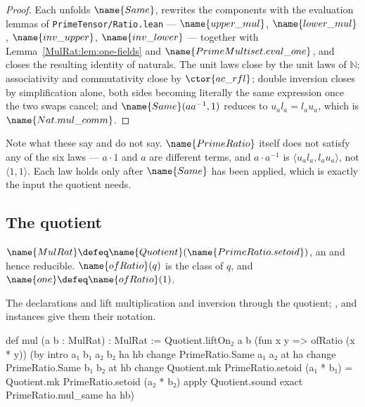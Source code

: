 \begin{proof}
Each unfolds $\name{Same}$, rewrites the components with the evaluation lemmas
of \texttt{PrimeTensor/Ratio.lean} --- $\name{upper\_mul}$,
$\name{lower\_mul}$, $\name{inv\_upper}$, $\name{inv\_lower}$ --- together
with Lemma~\ref{MulRat:lem:one-fields} and $\name{PrimeMultiset.eval\_one}$,
and closes the resulting identity of naturals.  The unit laws close by the
unit laws of $\mathbb{N}$; associativity and commutativity close by
$\ctor{ac\_rfl}$; double inversion closes by simplification alone, both sides
becoming literally the same expression once the two swaps cancel; and
$\name{Same}(a a^{-1}, 1)$ reduces to
$u_a l_a = l_a u_a$, which is $\name{Nat.mul\_comm}$.
\end{proof}

Note what these say and do not say.  $\name{PrimeRatio}$ itself does not
satisfy any of the six laws --- $a \cdot 1$ and $a$ are different terms, and
$a \cdot a^{-1}$ is $\langle u_a l_a, l_a u_a \rangle$, not
$\langle 1, 1 \rangle$.  Each law holds only after $\name{Same}$ has been
applied, which is exactly the input the quotient needs.

\subsection{The quotient}

\begin{definition}\label{MulRat:def:mulrat}
$\name{MulRat} \defeq \name{Quotient}(\name{PrimeRatio.setoid})$, an
 and hence reducible.  $\name{ofRatio}(q)$ is the class of $q$,
and $\name{one} \defeq \name{ofRatio}(1)$.
\end{definition}

\begin{definition}\label{MulRat:def:ops}
The declarations  and  lift multiplication
and inversion through the quotient; ,  and 
instances give them their notation.
\end{definition}

\begin{leancode}
def mul (a b : MulRat) : MulRat :=
  Quotient.liftOn₂ a b
    (fun x y => ofRatio (x * y))
    (by
      intro a₁ b₁ a₂ b₂ ha hb
      change PrimeRatio.Same a₁ a₂ at ha
      change PrimeRatio.Same b₁ b₂ at hb
      change Quotient.mk PrimeRatio.setoid (a₁ * b₁) =
        Quotient.mk PrimeRatio.setoid (a₂ * b₂)
      apply Quotient.sound
      exact PrimeRatio.mul_same ha hb)
\end{leancode}

